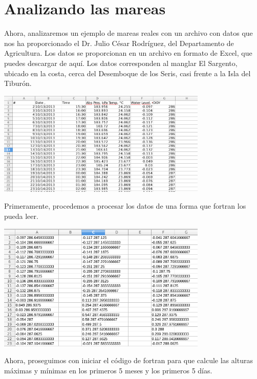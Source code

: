 \documentclass[12pt]{article}
\begin{document}
\section{Analizando las mareas}

	Ahora, analizaremos un ejemplo de mareas reales con un archivo con datos que nos ha proporcionado el Dr. Julio César Rodríguez, del Departamento de Agricultura. Los datos se proporcionan en un archivo en formato de Excel, que puedes descargar de aquí. Los datos corresponden al manglar El Sargento, ubicado en la costa, cerca del Desemboque de los Seris, casi frente a la Isla del Tiburón.
	
		 \begin{center}
	\includegraphics[width=10cm]{d.png}\\
\end{center}	 
	
	Primeramente, procedemos a procesar los datos de una forma que fortran los pueda leer.
	
		 \begin{center}
	\includegraphics[width=10cm]{d2.png}\\
\end{center}	 

Ahora, proseguimos con iniciar el código de fortran para que calcule las alturas máximas y mínimas en los primeros 5 meses y los primeros 5 días.
\end{document}
